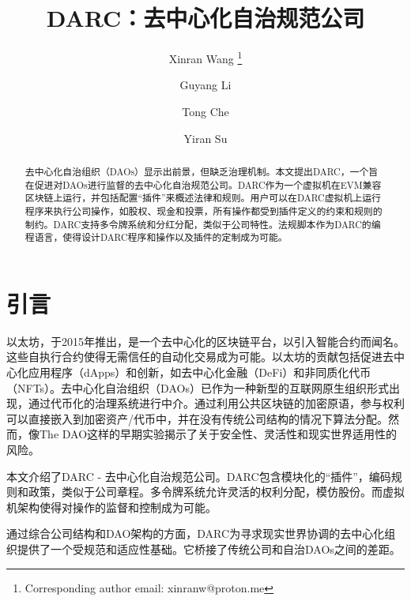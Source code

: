 \documentclass{article}
\title{DARC：去中心化自治规范公司}
\author[1]{Xinran Wang \thanks{Corresponding author email: xinranw@proton.me}}
\author[1]{Guyang Li}
\author[2]{Tong Che}
\author[3]{Yiran Su}
\affil[1]{DARC项目}
\affil[2]{NVIDIA 研究院}
\affil[3]{伊森伯格管理学院，马萨诸塞大学阿默斯特分校}
\begin{document}
\maketitle



\begin{abstract}
去中心化自治组织（DAOs）显示出前景，但缺乏治理机制。本文提出DARC，一个旨在促进对DAOs进行监督的去中心化自治规范公司。DARC作为一个虚拟机在EVM兼容区块链上运行，并包括配置“插件”来概述法律和规则。用户可以在DARC虚拟机上运行程序来执行公司操作，如股权、现金和投票，所有操作都受到插件定义的约束和规则的制约。DARC支持多令牌系统和分红分配，类似于公司特性。法规脚本作为DARC的编程语言，使得设计DARC程序和操作以及插件的定制成为可能。
\end{abstract}

\section{引言}


以太坊\cite{buterin2013ethereum}，于2015年推出，是一个去中心化的区块链平台，以引入智能合约而闻名。这些自执行合约使得无需信任的自动化交易成为可能。以太坊的贡献包括促进去中心化应用程序（dApps）和创新，如去中心化金融（DeFi）和非同质化代币（NFTs）。去中心化自治组织（DAOs）\cite{jentzsch2016decentralized}已作为一种新型的互联网原生组织形式出现，通过代币化的治理系统进行中介。通过利用公共区块链的加密原语，参与权利可以直接嵌入到加密资产/代币中，并在没有传统公司结构的情况下算法分配。然而，像The DAO这样的早期实验揭示了关于安全性、灵活性和现实世界适用性的风险。

本文介绍了DARC - 去中心化自治规范公司。DARC包含模块化的“插件”，编码规则和政策，类似于公司章程。多令牌系统允许灵活的权利分配，模仿股份。而虚拟机架构使得对操作的监督和控制成为可能。

通过综合公司结构和DAO架构的方面，DARC为寻求现实世界协调的去中心化组织提供了一个受规范和适应性基础。它桥接了传统公司和自治DAOs之间的差距。
\end{document}
